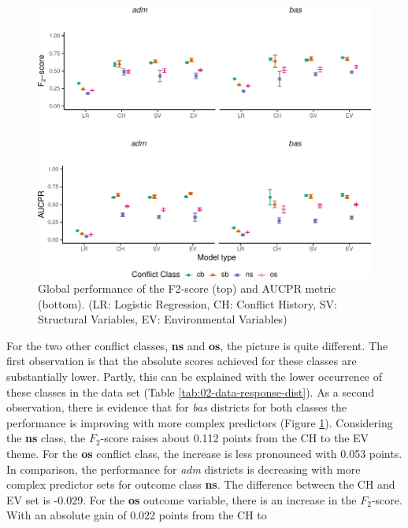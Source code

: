 \documentclass[a4paper,11pt]{article}
\begin{document}
\begin{figure}[H]

{\centering \includegraphics{thesis_files/figure-latex/04-results-global-f2-1} 

}

\caption[Global performance of the F2-score and AUPR metric.]{Global performance of the F2-score (top) and AUCPR metric (bottom). (LR: Logistic Regression, CH: Conflict History, SV: Structural Variables, EV: Environmental Variables)}\label{fig:04-results-global-f2}
\end{figure}
For the two other conflict classes, \textbf{ns} and \textbf{os}, the picture is quite different.
The first observation is that the absolute scores achieved for these classes are
substantially lower. Partly, this can be explained with the lower occurrence
of these classes in the data set (Table \ref{tab:02-data-response-dist}).
As a second observation, there is evidence that for \emph{bas} districts for both classes
the performance is improving with more complex predictors (Figure \ref{fig:04-results-global-f2}).
Considering the \textbf{ns} class, the \(F_2\)-score raises about 0.112 points from the
CH to the EV theme. For the \textbf{os} conflict class, the increase is less pronounced
with 0.053 points. In comparison, the performance for \emph{adm} districts is
decreasing with more complex predictor sets for outcome class \textbf{ns}. The difference
between the CH and EV set is -0.029. For the \textbf{os} outcome variable, there is an
increase in the \(F_2\)-score. With an absolute gain of 0.022 points from the CH to
\end{document}
